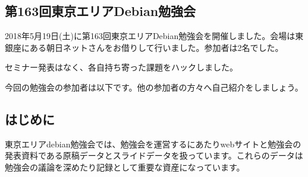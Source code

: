 \documentclass[mingoth,a4paper]{jsarticle}
\begin{document}

\subsection{第163回東京エリアDebian勉強会}

2018年5月19日(土)に第163回東京エリアDebian勉強会を開催しました。会場は東銀座にある朝日ネットさんをお借りして行いました。参加者は2名でした。

セミナー発表はなく、各自持ち寄った課題をハックしました。



今回の勉強会の参加者は以下です。他の参加者の方々へ自己紹介をしましょう。



\begin{multicols}{2}
{\small

}
\end{multicols}

%
%
%
%




\subsection{はじめに}

東京エリアdebian勉強会では、勉強会を運営するにあたりwebサイトと勉強会の発表資料である原稿データとスライドデータを扱っています。これらのデータは勉強会の議論を深めたり記録として重要な資産になっています。
\end{document}
